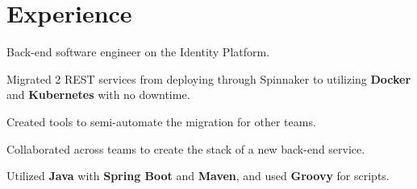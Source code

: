 \documentclass[]{deedy-resume-openfont}
\begin{document}
\begin{minipage}[t]{0.67\textwidth}


\section{Experience}
\vspace{\topsep} %
\begin{tightemize}
  \item Back-end software engineer on the Identity Platform.
  \item Migrated 2 REST services from deploying through Spinnaker to utilizing \textbf{Docker} and \textbf{Kubernetes} with no downtime.
  \item Created tools to semi-automate the migration for other teams.
  \item Collaborated across teams to create the stack of a new back-end service.
  \item Utilized \textbf{Java} with \textbf{Spring Boot} and \textbf{Maven}, and used \textbf{Groovy} for scripts.
\end{tightemize}
\sectionsep


\end{minipage}
\end{document}
